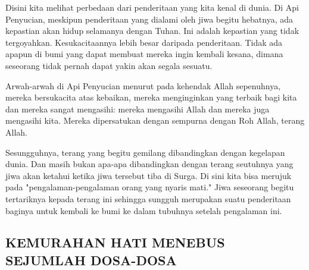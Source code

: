 
Disini kita melihat perbedaan dari penderitaan yang kita kenal di dunia. Di Api Penyucian, meskipun penderitaan yang dialami oleh jiwa begitu hebatnya, ada kepastian akan hidup selamanya dengan Tuhan. Ini adalah kepastian yang tidak tergoyahkan. Kesukacitaannya lebih besar daripada penderitaan. Tidak ada apapun di bumi yang dapat membuat mereka ingin kembali kesana, dimana seseorang tidak pernah dapat yakin akan segala sesuatu.



Arwah-arwah di Api Penyucian menurut pada kehendak Allah sepenuhnya, mereka bersukacita atas kebaikan, mereka menginginkan yang terbaik bagi kita dan mereka sangat mengasihi: mereka mengasihi Allah dan mereka juga mengasihi kita. Mereka dipersatukan dengan sempurna dengan Roh Allah, terang Allah.




Sesungguhnya, terang yang begitu gemilang dibandingkan dengan kegelapan dunia. Dan masih bukan apa-apa dibandingkan dengan terang seutuhnya yang jiwa akan ketahui ketika jiwa tersebut tiba di Surga. Di sini kita bisa merujuk pada "pengalaman-pengalaman orang yang nyaris mati." Jiwa seseorang begitu tertariknya kepada terang ini sehingga sungguh merupakan suatu penderitaan baginya untuk kembali ke bumi ke dalam tubuhnya setelah pengalaman ini.

\subsection*{KEMURAHAN HATI MENEBUS SEJUMLAH DOSA-DOSA}



